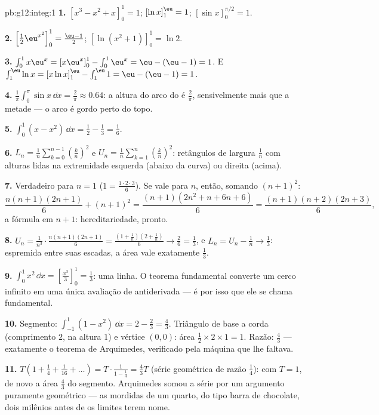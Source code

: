 \begin{solution}{pb:g12:integ:1}
\textbf{1.} $\left[x^3 - x^2 + x\right]_0^1 = 1$; \quad
$\left[\ln x\right]_1^{\eu} = 1$; \quad
$\left[\sin x\right]_0^{\pi/2} = 1$.

\textbf{2.} $\left[\frac12 \eu^{x^2}\right]_0^1 =
\frac{\eu - 1}{2}$; \quad
$\left[\ln(x^2 + 1)\right]_0^1 = \ln 2$.

\textbf{3.} $\int_0^1 x\eu^x = \left[x\eu^x\right]_0^1 -
\int_0^1 \eu^x = \eu - (\eu - 1) = 1$. E
$\int_1^{\eu} \ln x = \left[x\ln x\right]_1^{\eu} -
\int_1^{\eu} 1 = \eu - (\eu - 1) = 1$.

\textbf{4.} $\frac{1}{\pi}\int_0^\pi \sin x\,\dd x =
\frac{2}{\pi} \approx 0.64$: a altura  do arco do  é
$\frac2\pi$, sensivelmente mais que a metade --- o arco é
gordo perto do topo.

\textbf{5.} $\int_0^1 (x - x^2)\,\dd x = \frac12 - \frac13 =
\frac16$.

\textbf{6.} $L_n = \frac1n \sum_{k=0}^{n-1}
\left(\frac kn\right)^2$ e
$U_n = \frac1n \sum_{k=1}^{n} \left(\frac kn\right)^2$:
retângulos de largura $\frac1n$ com alturas lidas na
extremidade esquerda (abaixo da curva) ou direita (acima).

\textbf{7.} Verdadeiro para $n = 1$
($1 = \frac{1 \cdot 2 \cdot 3}{6}$). Se vale para $n$, então,
somando $(n+1)^2$:
\[
\frac{n(n+1)(2n+1)}{6} + (n+1)^2
= \frac{(n+1)\left(2n^2 + n + 6n + 6\right)}{6}
= \frac{(n+1)(n+2)(2n+3)}{6},
\]
a fórmula em $n + 1$: hereditariedade, pronto.

\textbf{8.} $U_n = \frac{1}{n^3} \cdot
\frac{n(n+1)(2n+1)}{6} = \frac{(1 + \frac1n)(2 + \frac1n)}{6}
\to \frac26 = \frac13$, e $L_n = U_n - \frac1n \to \frac13$:
espremida entre suas escadas, a área vale exatamente
$\frac13$.

\textbf{9.} $\int_0^1 x^2\,\dd x =
\left[\frac{x^3}{3}\right]_0^1 = \frac13$: uma linha. O teorema
fundamental converte um cerco infinito em uma única avaliação
de antiderivada --- é por isso que ele se chama fundamental.

\textbf{10.} Segmento: $\int_{-1}^{1}(1 - x^2)\,\dd x =
2 - \frac23 = \frac43$. Triângulo de base a corda (comprimento
$2$, na altura $1$) e vértice $(0,0)$: área
$\frac12 \times 2 \times 1 = 1$. Razão: $\frac43$ ---
exatamente o teorema de Arquimedes, verificado pela máquina que
lhe faltava.

\textbf{11.} $T\left(1 + \frac14 + \frac{1}{16} + \dots\right)
= T \cdot \frac{1}{1 - \frac14} = \frac43 T$ (série geométrica
de razão $\frac14$): com $T = 1$, de novo a área $\frac43$ do
segmento. Arquimedes somou a série por um argumento puramente
geométrico --- as mordidas de um quarto, do tipo barra de
chocolate, dois milênios antes de os limites terem nome.


\end{solution}
